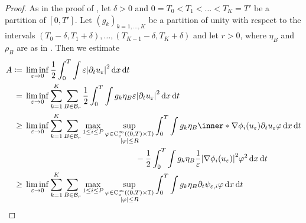 \begin{proof}
	As in the proof of , let $ \delta > 0 $ 
	and $ 0 = T_{ 0 } < T_{ 1 } < \dotsc < T_{ K } = T' $ be a partition of $ [ 
	0 , T' ] $. Let $ ( g_{ k } )_{ k = 1 , \dotsc , K } $ be a partition of 
	unity with respect to the intervals $ ( T_{ 0 } - \delta , T_{ 1 } + \delta 
	), \dotsc , ( T_{ K - 1 } - \delta , T_{ K } + \delta ) $ and let $ r > 0 
	$, where $ \eta_{ B } $ and $ \rho_{ B } $ are as in 
	. Then we estimate
	\begin{align*}
		 A \coloneqq{}& \liminf_{ \varepsilon \to 0 }
			\frac{ 1 }{ 2 }
			\int_{ 0 }^{ T }
				\int
					\varepsilon
					\abs{ \partial_{ t } u_{ \varepsilon } }^{ 2 }
				\dd{ x }
			\dd{ t }
		\\
		={} &
		\liminf_{ \varepsilon \to 0 }
			\sum_{ k = 1 }^{ K }
				\sum_{ B \in \mathcal{ B }_{ r } } 
					\frac{ 1 }{ 2 }
					\int_{ 0 }^{ T }
						\int
							g_{ k } \eta_{ B }
							\varepsilon
							\abs{ \partial_{ t } u_{ \varepsilon } }^{ 2 }
						\dd{ x }
					\dd{ t }
		\\
		\geq{} &
		\liminf_{ \varepsilon \to 0 }
			\sum_{ k = 1 }^{ K }
				\sum_{ B \in \mathcal{ B }_{ r } }
					\max_{ 1 \leq i \leq P }
						\sup_{ 
							\substack{ 
								\varphi \in \cont_{ \mathrm{c} }^{ \infty } 
								\left( ( 0 , T ) \times \flattorus \right)
								\\
								\abs{ \varphi } \leq R  
							}
						}
							\int_{ 0 }^{ T }
								\int
									g_{ k } \eta_{ B }
									\inner*{ \nabla \phi_{ i } ( u_{ 
									\varepsilon 
									} ) }{ \partial_{ t } u_{ \varepsilon } }
									\varphi
								\dd{ x }
							\dd{ t } 
		\\
							& \qquad \qquad \qquad \qquad \qquad \qquad \quad 
							\:\, -
							\frac{ 1 }{ 2 }
							\int_{ 0 }^{ T }
								\int
									g_{ k } \eta_{ B }
									\frac{ 1 }{ \varepsilon }
									\abs{ \nabla \phi_{ i } ( u_{ \varepsilon } 
									) }^{ 2 }
									\varphi^{ 2 }
								\dd{ x }
							\dd{ t }
		\\
		\geq{} &
		\liminf_{ \varepsilon \to 0 }
		\sum_{ k = 1 }^{ K }
		\sum_{ B \in \mathcal{ B }_{ r } }
		\max_{ 1 \leq i \leq P }
		\sup_{ 
			\substack{ 
				\varphi \in \cont_{ \mathrm{c} }^{ \infty } 
				\left( ( 0 , T ) \times \flattorus \right)
				\\
				\abs{ \varphi } \leq R  
			}
		}
		\int_{ 0 }^{ T }
		\int
		g_{ k } \eta_{ B }
		\partial_{ t } \psi_{ \varepsilon , i }
		\varphi
		\dd{ x }
		\dd{ t } 
		\\

\end{align*}
\end{proof}
